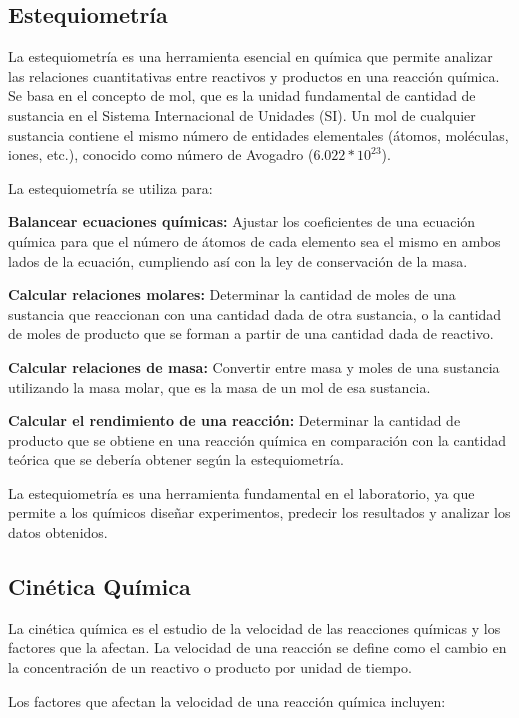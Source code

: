 \subsection{Estequiometría}
La estequiometría es una herramienta esencial en química que permite analizar las relaciones cuantitativas entre reactivos y productos en una reacción química. Se basa en el concepto de mol, que es la unidad fundamental de cantidad de sustancia en el Sistema Internacional de Unidades (SI). Un mol de cualquier sustancia contiene el mismo número de entidades elementales (átomos, moléculas, iones, etc.), conocido como número de Avogadro ($6.022 * 10^{23}$)\cite{Estequiometria}. 
    
La estequiometría se utiliza para: 
    
\textbf{Balancear ecuaciones químicas:} Ajustar los coeficientes de una ecuación química para que el número de átomos de cada elemento sea el mismo en ambos lados de la ecuación, cumpliendo así con la ley de conservación de la masa. 
    
\textbf{Calcular relaciones molares:} Determinar la cantidad de moles de una sustancia que reaccionan con una cantidad dada de otra sustancia, o la cantidad de moles de producto que se forman a partir de una cantidad dada de reactivo. 
    
\textbf{Calcular relaciones de masa:} Convertir entre masa y moles de una sustancia utilizando la masa molar, que es la masa de un mol de esa sustancia. 
    
\textbf{Calcular el rendimiento de una reacción:} Determinar la cantidad de producto que se obtiene en una reacción química en comparación con la cantidad teórica que se debería obtener según la estequiometría. 
    
La estequiometría es una herramienta fundamental en el laboratorio, ya que permite a los químicos diseñar experimentos, predecir los resultados y analizar los datos obtenidos. 

\subsection{Cinética Química}
La cinética química es el estudio de la velocidad de las reacciones químicas y los factores que la afectan. La velocidad de una reacción se define como el cambio en la concentración de un reactivo o producto por unidad de tiempo\cite{Cinetica_Quimica_Basica}. 

Los factores que afectan la velocidad de una reacción química incluyen: 

